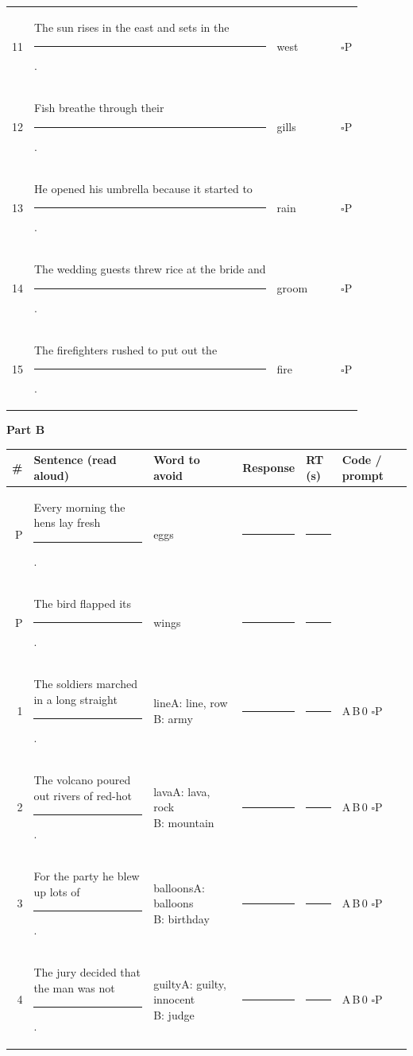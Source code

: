\documentclass[10pt,a4paper]{article}
\newcommand{\blank}[1][1.2cm]{\rule{#1}{0.4pt}}
\newcommand{\bx}{$\square$}
\begin{document}
{\begin{longtable}{@{}r>{\raggedright\arraybackslash}p{7.2cm}>{\raggedright\arraybackslash}p{1.9cm}p{2.4cm}p{1.1cm}l@{}}
11 & The sun rises in the east and sets in the \rule{1.1cm}{0.4pt}. & west & \blank[2.2cm] & \blank[0.9cm] & \bx P\\
12 & Fish breathe through their \rule{1.1cm}{0.4pt}. & gills & \blank[2.2cm] & \blank[0.9cm] & \bx P\\
13 & He opened his umbrella because it started to \rule{1.1cm}{0.4pt}. & rain & \blank[2.2cm] & \blank[0.9cm] & \bx P\\
14 & The wedding guests threw rice at the bride and \rule{1.1cm}{0.4pt}. & groom & \blank[2.2cm] & \blank[0.9cm] & \bx P\\
15 & The firefighters rushed to put out the \rule{1.1cm}{0.4pt}. & fire & \blank[2.2cm] & \blank[0.9cm] & \bx P\\
\bottomrule\end{longtable}}
\par{}\medskip\textbf{Part B}\par{\small\begin{longtable}{@{}r>{\raggedright\arraybackslash}p{7.2cm}>{\raggedright\arraybackslash}p{1.9cm}p{2.4cm}p{1.1cm}l@{}}\toprule \# & Sentence (read aloud) & Word to avoid & Response & RT (s) & Code / prompt\\ \midrule\endhead
P & Every morning the hens lay fresh \rule{1.1cm}{0.4pt}. & eggs & \blank[2.2cm] & \blank[0.9cm] & \\
P & The bird flapped its \rule{1.1cm}{0.4pt}. & wings & \blank[2.2cm] & \blank[0.9cm] & \\
\midrule
1 & The soldiers marched in a long straight \rule{1.1cm}{0.4pt}. & line\newline{\scriptsize A: line, row\newline B: army} & \blank[2.2cm] & \blank[0.9cm] & A\,B\,0 \bx P\\
2 & The volcano poured out rivers of red-hot \rule{1.1cm}{0.4pt}. & lava\newline{\scriptsize A: lava, rock\newline B: mountain} & \blank[2.2cm] & \blank[0.9cm] & A\,B\,0 \bx P\\
3 & For the party he blew up lots of \rule{1.1cm}{0.4pt}. & balloons\newline{\scriptsize A: balloons\newline B: birthday} & \blank[2.2cm] & \blank[0.9cm] & A\,B\,0 \bx P\\
4 & The jury decided that the man was not \rule{1.1cm}{0.4pt}. & guilty\newline{\scriptsize A: guilty, innocent\newline B: judge} & \blank[2.2cm] & \blank[0.9cm] & A\,B\,0 \bx P\\

\end{longtable}}
\end{document}

